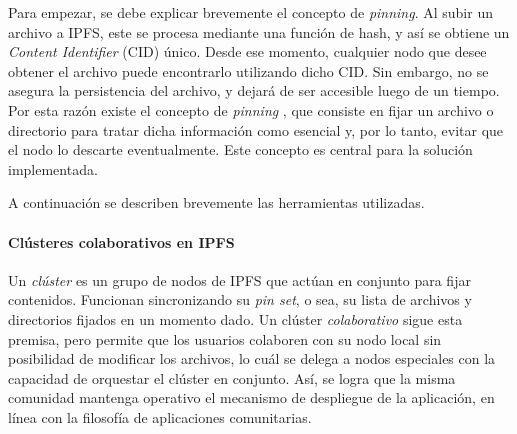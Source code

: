 Para empezar, se debe explicar brevemente el concepto de \textit{pinning}. Al subir un archivo a IPFS, este se procesa mediante una función de hash, y así se obtiene un \textit{Content Identifier} (CID) único. Desde ese momento, cualquier nodo que desee obtener el archivo puede encontrarlo utilizando dicho CID. Sin embargo, no se asegura la persistencia del archivo, y dejará de ser accesible luego de un tiempo. Por esta razón existe el concepto de \textit{pinning} \cite{pinning}, que consiste en fijar un archivo o directorio para tratar dicha información como esencial y, por lo tanto, evitar que el nodo lo descarte eventualmente. Este concepto es central para la solución implementada.

A continuación se describen brevemente las herramientas utilizadas.

\paragraph{Clústeres colaborativos en IPFS} Un \textit{clúster} es un grupo de nodos de IPFS que actúan en conjunto para fijar contenidos. Funcionan sincronizando su \textit{pin set}, o sea, su lista de archivos y directorios fijados en un momento dado. Un clúster \textit{colaborativo} sigue esta premisa, pero permite que los usuarios colaboren con su nodo local sin posibilidad de modificar los archivos, lo cuál se delega a nodos especiales con la capacidad de orquestar el clúster en conjunto. Así, se logra que la misma comunidad mantenga operativo el mecanismo de despliegue de la aplicación, en línea con la filosofía de aplicaciones comunitarias.



